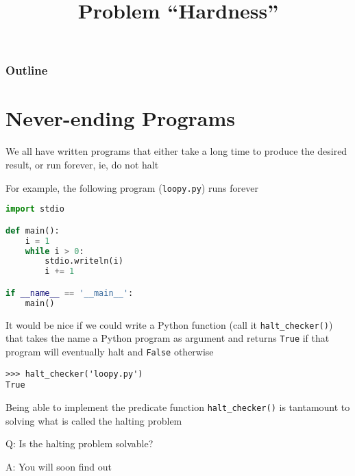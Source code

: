 \documentclass[8pt,a4paper,compress]{beamer}
\title{Problem ``Hardness''}
\date{}
\begin{document}
\begin{frame}
\vfill
\titlepage
\end{frame}

\begin{frame}
\frametitle{Outline}
\tableofcontents
\end{frame}

\section{Never-ending Programs}
\begin{frame}[fragile]
\pause

We all have written programs that either take a long time to produce the desired result, or run forever, ie, do not halt

\pause
\bigskip

For example, the following program (\lstinline{loopy.py}) runs forever

\begin{lstlisting}[language=python]
import stdio

def main():
    i = 1
    while i > 0:
        stdio.writeln(i)
        i += 1

if __name__ == '__main__':
    main()
\end{lstlisting}

\pause
\bigskip

It would be nice if we could write a Python function (call it \lstinline{halt_checker()}) that takes the name a Python program as argument and returns \lstinline{True} if that program will eventually halt and \lstinline{False} otherwise

\begin{lstlisting}[language={}]
>>> halt_checker('loopy.py')
True
\end{lstlisting}

\pause
\bigskip

Being able to implement the predicate function \lstinline{halt_checker()} is tantamount to solving what is called the halting problem

\pause
\bigskip

Q: Is the halting problem solvable?

\pause

A: You will soon find out
\end{frame}
\end{document}
